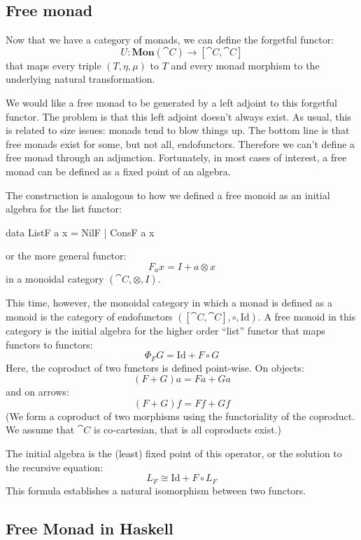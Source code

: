 \documentclass[DaoFP]{subfiles}
\begin{document}
\subsection{Free monad}

Now that we have a category of monads, we can define the forgetful functor:
\[ U \colon \mathbf{Mon}(\cat C) \to [\cat C, \cat C] \]
that maps every triple $(T, \eta, \mu)$ to $T$ and every monad morphism to the underlying natural transformation.

We would like a free monad to be generated by a left adjoint to this forgetful functor. The problem is that this left adjoint doesn't always exist. As usual, this is related to size issues: monads tend to blow things up. The bottom line is that free monads exist for some, but not all, endofunctors. Therefore we can't define a free monad through an adjunction. Fortunately, in most cases of interest, a free monad can be defined as a fixed point of an algebra. 

The construction is analogous to how we defined a free monoid as an initial algebra for the list functor:
\begin{haskell}
data ListF a x = NilF | ConsF a x
\end{haskell}
or the more general functor:
\[ F_a x = I + a \otimes x \]
in a monoidal category $(\cat C, \otimes, I)$.

This time, however, the monoidal category in which a monad is defined as a monoid is the category of endofunctors $([\cat C, \cat C], \circ, \text{Id})$. A free monoid in this category is the initial algebra for the higher order ``list'' functor that maps functors to functors:
\[ \Phi_F G = \text{Id} + F \circ G \]
Here, the coproduct of two functors is defined point-wise. On objects:
\[ (F + G) a = F a + G a \]
and on arrows:
\[ (F + G) f = F f + G f \]
(We form a coproduct of two morphisms using the functoriality of the coproduct. We assume that $\cat C$ is co-cartesian, that is all coproducts exist.)


The initial algebra is the (least) fixed point of this operator, or the solution to the recursive equation:
\[ L_F \cong \text{Id} + F \circ L_F \]
This formula establishes a natural isomorphism between two functors. 



\subsection{Free Monad in Haskell}
\end{document}
